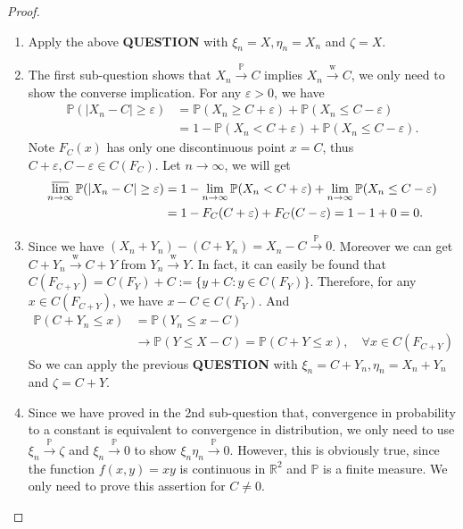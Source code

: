\documentclass[12pt]{article}
\renewcommand{\(}{\left(}%
\renewcommand{\)}{\right)}%
\renewcommand{\[}{\left[}%
\renewcommand{\]}{\right]}%
\renewcommand{\r}{\mathbb{R}}
\newcommand{\p}{\mathbb{P}}
\newtheorem{proof}{Proof.}}
\begin{document}
  \begin{proof}
  	\begin{enumerate}
  		\item Apply the above {\bfseries QUESTION} with $\xi_n=X,\eta_n=X_n$ and $\zeta=X$.
  		\item The first sub-question shows that $X_n\overset{\p}{\to}C$ implies $X_n\overset{\mathrm{w}}{\to}C$, we only need to show the converse implication. For any $\varepsilon>0$, we have
  		\begin{equation*}
  			\begin{split}
  				\p(|X_n-C|\geq \varepsilon)&=\p(X_n\geq C+\varepsilon)+\p(X_n\leq C-\varepsilon)\\
  				&=1-\p(X_n< C+\varepsilon)+\p(X_n\leq C-\varepsilon).
  			\end{split}
  		\end{equation*}
  		Note $F_C(x)$ has only one discontinuous point $x=C$, thus $C+\varepsilon,C-\varepsilon\in C(F_C)$. Let $n\to\infty$, we will get
  		\begin{equation*}
  			\begin{split}
  				\varlimsup_{n\to\infty}\p(|X_n-C|\geq \varepsilon)&=1-\lim_{n\to\infty}\p(X_n< C+\varepsilon)+\lim_{n\to\infty}\p(X_n\leq C-\varepsilon)\\
  				&=1-F_C(C+\varepsilon)+F_C(C-\varepsilon)=1-1+0=0.
  			\end{split}
  		\end{equation*}
  		\item Since we have $(X_n+Y_n)-(C+Y_n)=X_n-C\overset{\p}{\to}0$. Moreover we can get $C+Y_n\overset{\mathrm{w}}{\to}C+Y$ from $Y_n\overset{\mathrm{w}}{\to}Y$. In fact, it can easily be found that $C(F_{C+Y})=C(F_Y)+C:=\{y+C:y\in C(F_Y)\}$. Therefore, for any $x\in C(F_{C+Y})$, we have $x-C\in C(F_Y)$. And
  		\begin{equation*}
  			\begin{split}
  				\p(C+Y_n\leq x)&=\p(Y_n\leq x-C)\\
  				&\to \p(Y\leq X-C)=\p(C+Y\leq x),\quad\forall x\in C(F_{C+Y})
  			\end{split}
  		\end{equation*}
  		So we can apply the previous {\bfseries QUESTION} with $\xi_n=C+Y_n,\eta_n=X_n+Y_n$ and $\zeta=C+Y$.
  		\item Since we have proved in the 2nd sub-question that, convergence in probability to a constant is equivalent to convergence in distribution, we only need to use $\xi_n\overset{\p}{\to} \zeta$ and $\xi_n\overset{\p}{\to}0$ to show $\xi_n\eta_n\overset{\p}{\to}0$. However, this is obviously true, since the function $f(x,y)=xy$ is continuous in $\r^2$ and $\p$ is a finite measure. We only need to prove this assertion for $C\neq 0$.
  		

\end{enumerate}
\end{proof}
\end{document}
